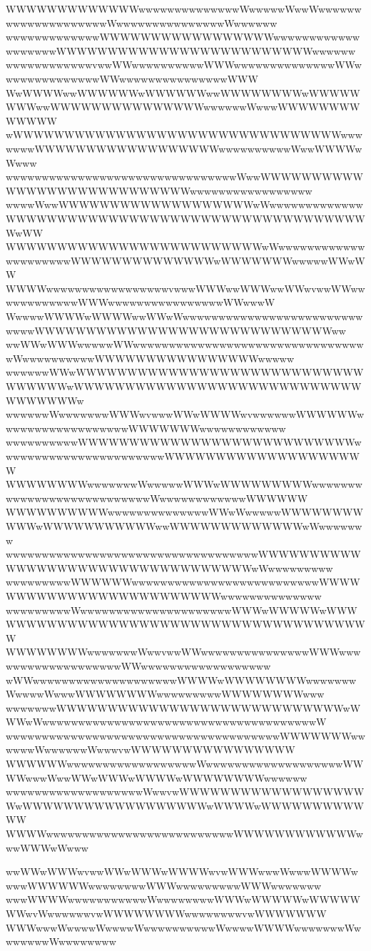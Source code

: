 \documentclass[a4paper]{article}
\begin{document}
\begin{procgrass}{\NabeAzz}
WWWWWWWWWWWWWwwwwwwwwwwwwwwWwwwwwWwwWwwwwwwwwwwwwwwwwwwwwWwwwwwwwwwwwwwwwWwwwwww
wwwwwwwwwwwwwWWWWWWWWWWWWWWWWWwwwwwwwwwwwwwwwwwwwWWWWWWWWWWWWWWWWWWWWWWWWWwwwwww
wwwwwwwwwwwwvwwWWwwwwwwwwwwWWWwwwwwwwwwwwwwwWWwwwwwwwwwwwwwwWWwwwwwwwwwwwwwwwWWW
WwWWWWwwWWWWWWwWWWWWWwwWWWWWWWWwWWWWWWWWwwWWWWWWWWWWWWWWWwwwwwwWwwwWWWWWWWWWWWWW
wWWWWWWWWWWWWWWWWWWWWWWWWWWWWWWWWwwwwwwwWWWWWWWWWWWWWWWWWWwwwwwwwwwwWwwWWWWwWwww
wwwwwwwwwwwwwwwwwwwwwwwwwwwwwwwwWwwWWWWWWWWWWWWWWWWWWWWWWWWWWWWwwwwwwwwwwwwwwwww
wwwwWwwWWWWWWWWWWWWWWWWWWWwWwwwwwwwwwwwwwWWWWWWWWWWWWWWWWWWWWWWWWWWWWWWWWWWWWwWW
WWWWWWWWWWWWWWWWWWWWWWWWWwWwwwwwwwwwwwwwwwwwwwwwWWWWWWWWWWWWWWwWWWWWWWwwwwwWWwWW
WWWWwwwwwwwwwwwwwwwwwvwwwWWWwwWWWwwWWwvwwWWwwwwwwwwwwwwWWWwwwwwwwwwwwwwwwwWWwwwW
WwwwwWWWWwWWWWwwWWwWwwwwwwwwwwwwwwwwwwwwwwwwwwwwwWWWWWWWWWWWWWWWWWWWWWWWWWWWWWww
wwWWwWWWwwwwwWWwwwwwwwwwwwwwwwwwwwwwwwwwwwwwwwwwWwwwwwwwwwwWWWWWWWWWWWWWWWWwwwww
wwwwwwWWwWWWWWWWWWWWWWWWWWWWWWWWWWWWWWWWWWWwWWWWWWWWWWWWWWWWWWWWWWWWWWWWWWWWWWWw
wwwwwwWwwwwwwwWWWwvwwwWWwWWWWwvwwwwwwWWWWWWwwwwwwwwwwwwwwwwwwWWWWWWWwwwwwwwwwwww
wwwwwwwwwwWWWWWWWWWWWWWWWWWWWWWWWWWWWwwwwwwwwwwwwwwwwwwwwwwwWWWWWWWWWWWWWWWWWWWW
WWWWWWWWwwwwwwwWwwwwwWWWwWWWWWWWWWwwwwwwwwwwwwwwwwwwwwwwwwwwwWwwwwwwwwwwwwWWWWWW
WWWWWWWWWWwwwwwwwwwwwwwwWWwWwwwwwWWWWWWWWWWWwWWWWWWWWWWWwwWWWWWWWWWWWWWwWwwwwwww
wwwwwwwwwwwwwwwwwwwwwwwwwwwwwwwwwwwWWWWWWWWWWWWWWWWWWWWWWWWWWWWWWWWWWwWwwwwwwwww
wwwwwwwwwWWWWWWwwwwwwwwwwwwwwwwwwwwwwwwwwWWWWWWWWWWWWWWWWWWWWWWWWWwwwwwwwwwwwwww
wwwwwwwwwWwwwwwwwwwwwwwwwwwwwwwWWWwWWWWWwWWWWWWWWWWWWWWWWWWWWWWWWWWWWWWWWWWWWWWW
WWWWWWWWwwwwwwwWwwvwwWWwwwwwwwwwwwwwwwWWWwwwwwwwwwwwwwwwwwwwWWwwwwwwwwwwwwwwwwww
wWWwwwwwwwwwwwwwwwwwwwwWWWWwWWWWWWWWwwwwwwwWwwwwWwwwWWWWWWWWwwwwwwwwwWWWWWWWWwww
wwwwwwwWWWWWWWWWWWWWWWWWWWWWWWWWWWWwWWWwWwwwwwwwwwwwwwwwwwwwwwwwwwwwwwwwwwwwwwwW
wwwwwwwwwwwwwwwwwwwwwwwwwwwwwwwwwwwwwwWWWWWWWwwwwwwWwwwwwwWwwwvwWWWWWWWWWWWWWWWW
WWWWWWwwwwwwwwwwwwwwwwwwWwwwwwwwwwwwwwwwwwwwWWWWwwwWwwWWwWWWwWWWWwWWWWWWWWwwwwww
wwwwwwwwwwwwwwwwwwwWwwvwWWWWWWWWWWWWWWWWWWWwWWWWWWWWWWWWWWWWWWwWWWWwWWWWWWWWWWWW
WWWWwwwwwwwwwwwwwwwwwwwwwwwwwwWWWWWWWWWWWWwwwWWWwWwww
\end{procgrass}

\newcommand*{\AhoFont}{\usefont{OT1}{cmfr}{m}{it}\LARGE}

\begin{procgrass}{\echo}
wwWWwWWWwvwwWWwWWWwWWWWwvwWWWwwwWwwwWWWWwwwwWWWWWWwwwwwwwwWWWwwwwwwwwwWWWwwwwwww
wwwWWWWwwwwwwwwwwwWwwwwwwwwWWWwWWWWWwWWWWWWWwvWwwwwwwvwWWWWWWWWwwwwwwwwvwWWWWWWW
WWWwwwWwwwwWwwwwWwwwwwwwwwwWwwwwWWWWwwwwwwwWwwwwwwwWwwwwwwww
\end{procgrass}

\noindent{}
\end{document}
